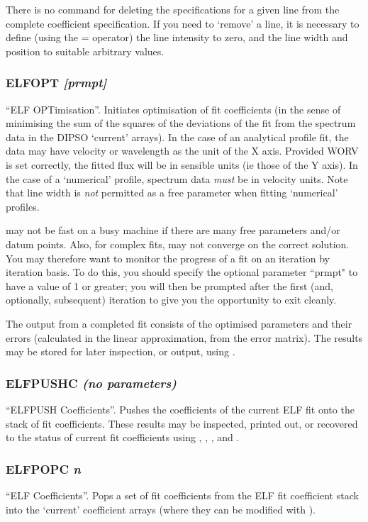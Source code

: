 \documentclass[twoside,11pt,noabs,nolof]{starlink}
\providecommand{\dipcom}[3]{\subsubsection*{\label{COM:#1}\textbf{#1} \emph{#2}}}
\begin{document}
There is no command for deleting the specifications for a given line
from the complete coefficient specification. If you need to `remove' a
line, it is necessary to define (using the = operator) the line
intensity to zero, and the line width and position to suitable
arbitrary values.

\dipcom{ELFOPT}{[prmpt]}{Fits a set of emission lines}
``ELF OPTimisation''. Initiates optimisation of fit coefficients (in
the sense of minimising the sum of the squares of the deviations of
the fit from the spectrum data in the DIPSO `current' arrays). In the
case of an analytical profile fit, the data may have velocity or
wavelength as the unit of the X axis. Provided WORV is set correctly,
the fitted flux will be in sensible units (ie those of the Y axis). In
the case of a `numerical' profile, spectrum data \emph{must} be in
velocity units. Note that line width is \emph{not} permitted as a free
parameter when fitting `numerical' profiles.

  may not be fast on a busy machine if there are many free
parameters and/or datum points. Also, for complex fits,   may not
converge on the correct solution. You may therefore want to monitor
the progress of a fit on an iteration by iteration basis. To do this,
you should specify the optional parameter ``prmpt" to have a value of
1 or greater; you will then be prompted after the first (and,
optionally, subsequent) iteration to give you the opportunity to exit
  cleanly.

The output from a completed fit consists of the optimised parameters
and their errors (calculated in the linear approximation, from the
error matrix). The results may be stored for later inspection, or
output, using .

\dipcom{ELFPUSHC}{(no parameters)}{Pushes the current ELF co-efficients onto the co-efficient stack}
``ELFPUSH Coefficients''. Pushes the coefficients of the current ELF
fit onto the stack of fit coefficients. These results may be
inspected, printed out, or recovered to the status of current fit
coefficients using ,  ,  ,  and .

\dipcom{ELFPOPC}{n}{Pops an entry from the ELF fit co-efficient stack}
``ELF   Coefficients''. Pops a set of fit coefficients from the ELF
fit coefficient stack into the `current' coefficient arrays (where
they can be modified with ).
\end{document}
